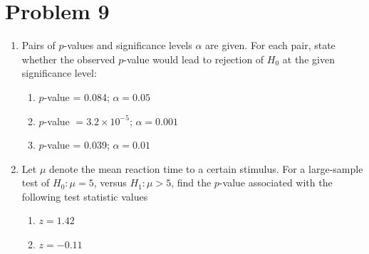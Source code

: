 \documentclass[11pt,twoside]{article}
\newcommand{\pts}[1]{\marginpar{ \small\hspace{0pt} \textit{[#1]} } }
\numberwithin{equation}{section}
\newcommand{\?}{\stackrel{?}{=}}
\begin{document}
\section*{Problem 9       }
\begin{enumerate}[\bf (a)]
\item Pairs of $p$-values and significance levels $\alpha$ are given.
For each pair, state whether the observed $p$-value would lead to rejection of $H_0$ at the given significance level:
\begin{enumerate}[ \bf (i)]
\item $p$-value = 0.084; $\alpha = 0.05$ \pts{1}
  \vspace{10ex}
  
\item  $p$-value $= 3.2 \times 10^{-5}$; $\alpha = 0.001$  \pts{1}
  \vspace{10ex}
  
\item $p$-value = 0.039; $\alpha = 0.01$  \pts{1}
  \vspace{10ex}
  
\end{enumerate}



\item Let $\mu$  denote the mean reaction time to a certain stimulus. For a large-sample test of $H_0: \mu = 5$, 
  versus $H_1: \mu > 5$, find the $p$-value associated with the following test statistic values
  \begin{enumerate}[\bf (i)]
  \item $z = 1.42$ \pts{2}
    \vspace{30ex}
    
    \item $z = -0.11$ \pts{2}
  \end{enumerate}
 
    \vspace{25ex}
\end{enumerate}


\eject
\end{document}
